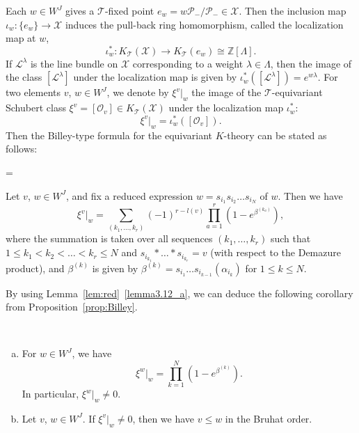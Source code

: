 \documentclass[ALCO,ThmDefs,Unicode,epreuves]{cedram}
\newcommand\Int{\mathbb{Z}}
\newcommand\LL{\mathcal{L}}
\newcommand\OO{\mathcal{O}}
\newcommand\PP{\mathcal{P}}
\newcommand\TT{\mathcal{T}}
\newcommand\XX{\mathcal{X}}
\begin{document}
Each $w \in W^J$ gives a $\TT$-fixed point $e_w = w \PP_-/\PP_- \in \XX$.
Then the inclusion map $\iota_w : \{ e_w \} \to \XX$ induces the pull-back ring homomorphism, 
called the localization map at $w$,
$$
\iota_w^* : K_{\TT}(\XX) \to K_{\TT}(e_w) \cong \Int[\Lambda].
$$
If $\LL^\lambda$ is the line bundle on $\XX$ corresponding to a weight $\lambda \in \Lambda$, 
then the image of the class $[\LL^\lambda]$ under the localization map is given by
$\iota_w^*( [\LL^\lambda] ) = e^{w \lambda}$.
For two elements $v$, $w \in W^J$, we denote by $\xi^v|_w$ 
the image of the $\TT$-equivariant Schubert class $\xi^v = [\OO_v] \in K_{\TT}(\XX)$ 
under the localization map $\iota_w^*$:
$$
\xi^v|_w = \iota_w^* ( [\OO_v] ).
$$
Then the Billey-type formula for the equivariant $K$-theory can be stated as follows:

\setbox\toto=\hbox {\cite[Proposition~2.10]{LSS}}
\begin{prop}[\box\toto]
\label{prop:Billey}
Let $v$, $w \in W^J$, and fix a reduced expression $w = s_{i_1} s_{i_2} \dots s_{i_N}$ of $w$.
Then we have
\begin{equation}
\label{eq:Billey}
\xi^v|_w 
 =
\sum_{(k_1, \dots, k_r)}
 (-1)^{r-l(v)} \prod_{a=1}^r \left( 1 - e^{\beta^{(k_a)}} \right),
\end{equation}
where the summation is taken over all sequences $(k_1, \dots, k_r)$ 
such that $1 \le k_1 < k_2 < \dots < k_r \le N$ and $s_{i_{k_1}} * \dots * s_{i_{k_r}} = v$ 
(with respect to the Demazure product), 
and $\beta^{(k)}$ is given by $\beta^{(k)} = s_{i_1} \dots s_{i_{k-1}}(\alpha_{i_k})$ for $1 \le k \le N$.
\end{prop}

By using Lemma~\ref{lem:red}~\ref{lemma3.12_a}, we can deduce the following corollary from Proposition~\ref{prop:Billey}.

\begin{coro} \label{cor:Billey}\ 

\begin{enumerate}[(a)]
\item\label{coro4.2_a} %
For $w \in W^J$, we have
\begin{equation}
\label{eq:Billey2}
\xi^w|_w = \prod_{k=1}^N \left( 1 - e^{\beta^{(k)}} \right).
\end{equation}
In particular, $\xi^w|_w \neq 0$.
\item\label{coro4.2_b} %
Let $v$, $w \in W^J$.
If $\xi^v|_w \neq 0$, then we have $v \le w$ in the Bruhat order.
\end{enumerate}
\end{coro}
\end{document}
